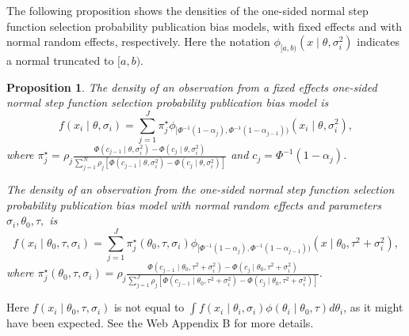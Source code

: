 \documentclass[useAMS,usenatbib,referee]{biom}
\newtheorem{prop}[theorem]{Proposition}
\begin{document}
The following proposition shows the densities of the one-sided normal step function selection probability publication bias models, with fixed effects and with normal random effects, respectively. Here the notation $\phi_{[a,b)}(x\mid\theta,\sigma_i^2)$ indicates a normal truncated to $[a,b)$.
\begin{prop}
\label{prop:One-sided normal discrete probability vector publication bias model-1}
The density of an observation from a fixed effects one-sided normal step function selection probability publication bias model is
\begin{equation}
f(x_{i}\mid\theta,\sigma_{i}) = \sum_{j=1}^{J}\pi_{j}^\star\phi_{[\Phi^{-1}(1-\alpha_{j}),\Phi^{-1}(1-\alpha_{j-1}))}(x_{i}\mid\theta,\sigma_{i}^2),
\end{equation}
where $\pi_{j}^{\star}=\rho_{j}\frac{\Phi(c_{j-1}\mid\theta,\sigma_{i}^2)-\Phi(c_{j}\mid\theta,\sigma_{i}^2)}{\sum_{j=1}^{N}\rho_{j}\left[\Phi(c_{j-1}\mid\theta,\sigma_{i}^2)-\Phi(c_{j}\mid\theta,\sigma_{i}^2)\right]}$ and $c_{j}=\Phi^{-1}(1-\alpha_{j})$.

The density of an observation from the one-sided normal step function selection probability publication bias model with normal random effects and parameters $\sigma_{i},\theta_{0},\tau,$ is
\begin{equation}\label{eq:Random effects, publication bias}
f(x_i\mid\theta_{0},\tau,\sigma_{i})=\sum_{j=1}^{J}\pi_{j}^{\star}(\theta_0,\tau,\sigma_{i})\phi_{[\Phi^{-1}(1-\alpha_{j}),\Phi^{-1}(1-\alpha_{j-1}))}(x\mid\theta_{0},\tau^{2}+\sigma_{i}^{2}),
\end{equation}
where $\pi_{j}^{\star}(\theta_0,\tau,\sigma_{i})=\rho_{j}\frac{\Phi(c_{j-1}\mid\theta_{0},\tau^{2}+\sigma_{i}^{2})-\Phi(c_{j}\mid\theta_{0},\tau^{2}+\sigma_{i}^{2})}{\sum_{j=1}^{J}\rho_{j}\left[\Phi(c_{j-1}\mid\theta_{0},\tau^{2}+\sigma_{i}^{2})-\Phi(c_{j}\mid\theta_{0},\tau^{2}+\sigma_{i}^{2})\right]}$.
\end{prop}

Here $f(x_i\mid\theta_{0},\tau,\sigma_i)$ is not equal to $\int f(x_{i}\mid\theta_{i},\sigma_{i})\phi(\theta_{i}\mid\theta_{0},\tau)d\theta_{i}$, as it might have been expected. See the Web Appendix B for more details.
\end{document}
